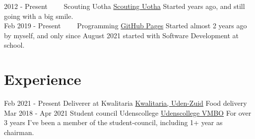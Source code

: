\documentclass[letterpaper]{twentysecondcv} %
\begin{document}
    \begin{twenty} %
        \twentyitem
        {2012 -}
        {Present~~~~}
        {Scouting Uotha}
        {\href{https://www.uotha.nl/}{Scouting Uotha}}
        {}
        { Started years ago, and still going with a big smile.}\\
        \twentyitem
        {Feb 2019 -}
        {Present~~~~}
        {Programming}
        {\href{https://tais993.github.io/}{GitHub Pages}}
        {}
        {Started almost 2 years ago by myself, and only since August 2021 started with Software Development at school.}
    \end{twenty}

    \vspace{6mm}




    \section{Experience}
    \begin{twenty} %
        \twentyitem
        {Feb 2021 -}
        {Present}
        {Deliverer at Kwalitaria}
        {\href{https://kwalitaria.nl/uden-zuid/uden-zuid/}{Kwalitaria, Uden-Zuid}}
        {}
        {Food delivery}\\
        \twentyitem
        {Mar 2018 -}
        {Apr 2021}
        {Student council Udenscollege}
        {\href{https://www.udenscollege.nl/vmbo/startpagina-vmbo/}{Udenscollege VMBO}}
        {}
        {
            For over 3 years I've been a member of the student-council, including 1+ year as chairman.
        }
    \end{twenty}

    \vspace{6mm}


\end{document}
